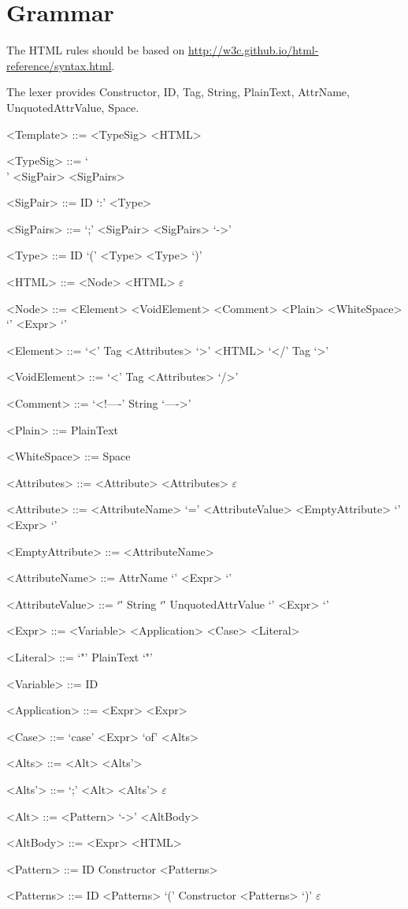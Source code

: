 \documentclass{report}
\begin{document}
\setlength{\grammarparsep}{4pt} %
\setlength{\grammarindent}{12em} %

\section*{Grammar}

The HTML rules should be based on
\url{http://w3c.github.io/html-reference/syntax.html}.

The lexer provides Constructor, ID, Tag, String, PlainText,
AttrName, UnquotedAttrValue, Space.

\begin{grammar}

<Template> ::= <TypeSig> <HTML>

<TypeSig> ::= `\\' <SigPair> <SigPairs>

<SigPair> ::= ID `:' <Type>

<SigPairs> ::= `;' <SigPair> <SigPairs>
\alt `->'

<Type> ::= ID
\alt `(' <Type> <Type> `)'

<HTML> ::= <Node> <HTML>
\alt $\varepsilon$

<Node> ::= <Element>
\alt <VoidElement>
\alt <Comment>
\alt <Plain>
\alt <WhiteSpace>
\alt `{' <Expr> `}'

<Element> ::= `<' Tag <Attributes> `>' <HTML> `</' Tag `>'

<VoidElement> ::= `<' Tag <Attributes> `/>'

<Comment> ::= `<!----' String `---->'

<Plain> ::= PlainText

<WhiteSpace> ::= Space

<Attributes> ::= <Attribute> <Attributes>
\alt $\varepsilon$

<Attribute> ::= <AttributeName> `=' <AttributeValue>
\alt <EmptyAttribute>
\alt `{' <Expr> `}'

<EmptyAttribute> ::= <AttributeName>

<AttributeName> ::= AttrName
\alt `{' <Expr> `}'

<AttributeValue> ::= `\"' String `\"'
\alt UnquotedAttrValue
\alt `{' <Expr> `}'

<Expr> ::= <Variable>
\alt <Application>
\alt <Case>
\alt <Literal>

<Literal> ::= `"' PlainText `"'

<Variable> ::= ID

<Application> ::= <Expr> <Expr>

<Case> ::= `case' <Expr> `of' <Alts>

<Alts> ::= <Alt> <Alts'>

<Alts'> ::= `;' <Alt> <Alts'>
\alt $\varepsilon$

<Alt> ::= <Pattern> `->' <AltBody>

<AltBody> ::= <Expr>
\alt <HTML>

<Pattern> ::= ID
\alt Constructor <Patterns>

<Patterns> ::= ID <Patterns>
\alt `(' Constructor <Patterns> `)'
\alt $\varepsilon$


\end{grammar}
\end{document}
